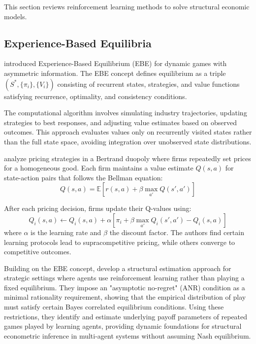 This section reviews reinforcement learning methods to solve structural economic models.


\subsection{Experience-Based Equilibria}


\citet{FershtmanPakes2012} introduced Experience-Based Equilibrium (EBE) for dynamic games with asymmetric information. The EBE concept defines equilibrium as a triple $(S^*, \{\pi_i\}, \{V_i\})$ consisting of recurrent states, strategies, and value functions satisfying recurrence, optimality, and consistency conditions.

The computational algorithm involves simulating industry trajectories, updating strategies to best responses, and adjusting value estimates based on observed outcomes. This approach evaluates values only on recurrently visited states rather than the full state space, avoiding integration over unobserved state distributions.

\citet{AskerEtAl2020} analyze pricing strategies in a Bertrand duopoly where firms repeatedly set prices for a homogeneous good. Each firm maintains a value estimate $Q(s,a)$ for state-action pairs that follows the Bellman equation:
\begin{equation}
Q(s,a) = \mathbb{E}[r(s,a) + \beta \max_{a'}Q(s',a')]
\end{equation}

After each pricing decision, firms update their Q-values using:
\begin{equation}
Q_i(s,a) \leftarrow Q_i(s,a) + \alpha[\pi_i + \beta \max_{a'}Q_i(s',a') - Q_i(s,a)]
\end{equation}
where $\alpha$ is the learning rate and $\beta$ the discount factor. The authors find certain learning protocols lead to supracompetitive pricing, while others converge to competitive outcomes.

Building on the EBE concept, \citet{LomysMagnolfi2024} develop a structural estimation approach for strategic settings where agents use reinforcement learning rather than playing a fixed equilibrium. They impose an "asymptotic no-regret" (ANR) condition as a minimal rationality requirement, showing that the empirical distribution of play must satisfy certain Bayes correlated equilibrium conditions. Using these restrictions, they identify and estimate underlying payoff parameters of repeated games played by learning agents, providing dynamic foundations for structural econometric inference in multi-agent systems without assuming Nash equilibrium.

